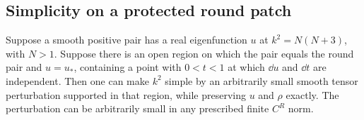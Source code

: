 \subsection{Simplicity on a protected round patch}

\begin{lemma}\label{lem:simplicity}
Suppose a smooth positive pair has a real eigenfunction $u$ at
$k^2=N(N+3)$, with $N>1$. Suppose there is an open region on which
the pair equals the round pair and $u=u_*$, containing a point with
$0<t<1$ at which $\dd u$
and $\dd t$ are independent. Then one can make $k^2$ simple by
an arbitrarily small smooth tensor perturbation supported in that
region, while preserving $u$ and $\rho$ exactly. The perturbation
can be arbitrarily small in any prescribed finite $C^R$ norm.
\end{lemma}


